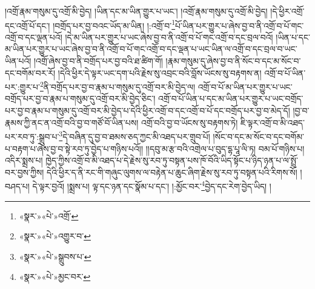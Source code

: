 །འགྲོ་རྣམ་གསུམ་དུ་འགྲོ་མི་བྱེད། །ཡིན་དང་མ་ཡིན་གྱུར་པ་ཡང་། །འགྲོ་རྣམ་གསུམ་དུ་འགྲོ་མི་བྱེད། །དེ་ཕྱིར་འགྲོ་དང་འགྲོ་པོ་དང་། །བགྲོད་པར་བྱ་བའང་ཡོད་མ་ཡིན། །:འགྲོ་བ་\footnote{«སྣར་»«པེ་»འགྲོ་}པོ་ཡིན་པར་གྱུར་པ་ཞེས་བྱ་བ་ནི་འགྲོ་བ་པོ་གང་འགྲོ་བ་དང་ལྡན་པའོ། །དེ་མ་ཡིན་པར་གྱུར་པ་ཡང་ཞེས་བྱ་བ་ནི་འགྲོ་བ་པོ་གང་འགྲོ་བ་དང་བྲལ་བའོ། །ཡིན་པ་དང་མ་ཡིན་པར་གྱུར་པ་ཡང་ཞེས་བྱ་བ་ནི་འགྲོ་བ་པོ་གང་འགྲོ་བ་དང་ལྡན་པ་ཡང་ཡིན་ལ་འགྲོ་བ་དང་བྲལ་བ་ཡང་ཡིན་པའོ། །འགྲོ་ཞེས་བྱ་བ་ནི་བགྲོད་པར་བྱ་བའི་ཐ་ཚིག་གོ། །རྣམ་གསུམ་དུ་ཞེས་བྱ་བ་ནི་སོང་བ་དང་མ་སོང་བ་དང་བགོམ་བར་རོ། །དེའི་ཕྱིར་དེ་ལྟར་ཡང་དག་པའི་རྗེས་སུ་འབྲང་བའི་བློས་ཡོངས་སུ་བརྟགས་ན། འགྲོ་བ་པོ་ཡིན་པར་:གྱུར་པ་\footnote{«སྣར་»«པེ་»འགྱུར་བ་}ནི་བགྲོད་པར་བྱ་བ་རྣམ་པ་གསུམ་དུ་འགྲོ་བར་མི་བྱེད་ལ། འགྲོ་བ་པོ་མ་ཡིན་པར་གྱུར་པ་ཡང་བགྲོད་པར་བྱ་བ་རྣམ་པ་གསུམ་དུ་འགྲོ་བར་མི་བྱེད་ཅིང་། འགྲོ་བ་པོ་ཡིན་པ་དང་མ་ཡིན་པར་གྱུར་པ་ཡང་བགྲོད་པར་བྱ་བ་རྣམ་པ་གསུམ་དུ་འགྲོ་བར་མི་བྱེད་པ་དེའི་ཕྱིར་འགྲོ་བ་དང་འགྲོ་བ་པོ་དང་བགྲོད་པར་བྱ་བ་མེད་དོ། །བྱ་བ་རྣམས་ཀྱི་ནང་ན་འགྲོ་བའི་བྱ་བ་གཙོ་བོ་ཡིན་པས། འགྲོ་བའི་བྱ་བ་ཡོངས་སུ་བརྟགས་ཏེ། ཇི་ལྟར་འགྲོ་བ་མི་འཐད་པར་རབ་ཏུ་:སྒྲུབ་པ་\footnote{«སྣར་»«པེ་»སྒྲུབས་པ་}དེ་བཞིན་དུ་བྱ་བ་ཐམས་ཅད་ཀྱང་མི་འཐད་པར་གྲུབ་པོ། །སོང་བ་དང་མ་སོང་བ་དང་བགོམ་པ་བརྟག་པ་ཞེས་བྱ་བ་སྟེ་རབ་ཏུ་བྱེད་པ་གཉིས་པའོ།། །།དབུ་མ་རྩ་བའི་འགྲེལ་པ་བུད་དྷ་པཱ་ལི་ཏ། བམ་པོ་གཉིས་པ། འདིར་སྨྲས་པ། ཁྱེད་ཀྱིས་འགྲོ་བ་མི་འཐད་པ་དེ་རྗེས་སུ་རབ་ཏུ་བསྟན་པས་ཁོ་བོའི་ཡིད་སྟོང་པ་ཉིད་ཉན་པ་ལ་སྤྲོ་བར་བྱས་ཀྱིས། དེའི་ཕྱིར་ད་ནི་རང་གི་གཞུང་ལུགས་ལ་བརྟེན་པ་ཆུང་ཞིག་རྗེས་སུ་རབ་ཏུ་བསྟན་པའི་རིགས་སོ། །བཤད་པ། དེ་ལྟར་བྱའོ། །སྨྲས་པ། ལྟ་དང་ཉན་དང་སྣོམ་པ་དང་། །:མྱོང་བར་\footnote{«སྣར་»«པེ་»མྱང་བར་}བྱེད་དང་རེག་བྱེད་ཡིད། །
